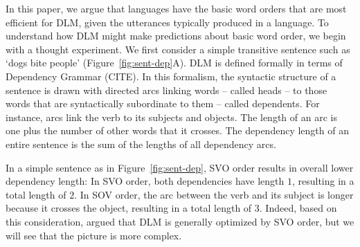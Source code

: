 \documentclass[11pt,a4paper]{article}
\begin{document}
In this paper, we argue that languages have the basic word orders that are most efficient for DLM, given the utterances typically produced in a language.
To understand how DLM might make predictions about basic word order, we begin with a thought experiment.
We first consider a simple transitive sentence such as `dogs bite people' (Figure~\ref{fig:sent-dep}A). 
DLM is defined formally in terms of Dependency Grammar (CITE).
In this formalism, the syntactic structure of a sentence is drawn with directed arcs linking words -- called heads -- to those words that are syntactically subordinate to them -- called dependents.
For instance, arcs link the verb to its subjects and objects.
The length of an arc is one plus the number of other words that it crosses.
The dependency length of an entire sentence is the sum of the lengths of all dependency arcs.

In a simple sentence as in Figure~\ref{fig:sent-dep}, SVO order results in overall lower dependency length:
In SVO order, both dependencies have length $1$, resulting in a total length of $2$.
In SOV order, the arc between the verb and its subject is longer because it crosses the object, resulting in a total length of $3$.
Indeed, based on this consideration, \cite{ferrer-i-cancho-placement-2017} argued that DLM is generally optimized by SVO order, but we will see that the picture is more complex.
\end{document}
